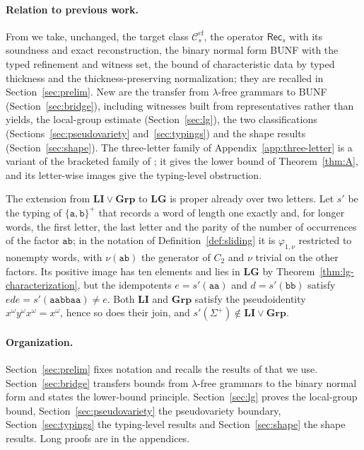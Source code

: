 \documentclass[11pt]{article}
\numberwithin{equation}{section}
\theoremstyle{plain}
\theoremstyle{definition}
\theoremstyle{remark}
\theoremstyle{plain}
\newcommand{\cf}{\mathrm{cf}}
\newcommand{\Ccf}[1]{\mathcal C_{#1}^{\cf}}
\newcommand{\Rec}{\mathsf{Rec}}
\newcommand{\LG}{\mathbf{LG}}
\begin{document}
\paragraph{Relation to previous work.}
From \cite{kuriyamaCFG} we take, unchanged, the target class $\Ccf{s}$, the
operator $\Rec_s$ with its soundness and exact reconstruction, the binary
normal form BUNF with the typed refinement and witness set, the bound of
characteristic data by typed thickness and the thickness-preserving
normalization; they are recalled in Section~\ref{sec:prelim}.  New are the transfer from $\lambda$-free grammars to BUNF
(Section~\ref{sec:bridge}), including witnesses built from representatives
rather than yields, the local-group estimate (Section~\ref{sec:lg}), the two
classifications (Sections~\ref{sec:pseudovariety} and~\ref{sec:typings}) and
the shape results (Section~\ref{sec:shape}).  The three-letter family of
Appendix~\ref{app:three-letter} is a variant of the bracketed family of
\cite[Proposition~6.4]{kuriyamaCFG}; it gives the lower bound of
Theorem~\ref{thm:A}, and its letter-wise images give the typing-level
obstruction.

The extension from $\mathbf{LI}\vee\mathbf{Grp}$ to $\LG$ is proper already over
two letters.  Let $s'$ be the typing of $\{\mathtt a,\mathtt b\}^+$ that records a
word of length one exactly and, for longer words, the first letter, the last
letter and the parity of the number of occurrences of the factor $\mathtt{ab}$;
in the notation of Definition~\ref{def:sliding} it is $\varphi_{1,\nu}$
restricted to nonempty words, with $\nu(\mathtt{ab})$ the generator of $C_2$
and $\nu$ trivial on the other factors.  Its positive image has ten elements
and lies in $\LG$ by Theorem~\ref{thm:lg-characterization}, but the idempotents
$e=s'(\mathtt{aa})$ and $d=s'(\mathtt{bb})$ satisfy $ede=s'(\mathtt{aabbaa})\ne e$.
Both $\mathbf{LI}$ and $\mathbf{Grp}$ satisfy the pseudoidentity
$x^\omega y^\omega x^\omega=x^\omega$, hence so does their join, and
$s'(\Sigma^+)\notin\mathbf{LI}\vee\mathbf{Grp}$.

\paragraph{Organization.}
Section~\ref{sec:prelim} fixes notation and recalls the results of
\cite{kuriyamaCFG} that we use.
Section~\ref{sec:bridge} transfers bounds from $\lambda$-free grammars to the binary
normal form and states the lower-bound principle.  Section~\ref{sec:lg} proves
the local-group bound, Section~\ref{sec:pseudovariety} the pseudovariety
boundary, Section~\ref{sec:typings} the typing-level results and
Section~\ref{sec:shape} the shape results.  Long proofs are in the appendices.
\end{document}
